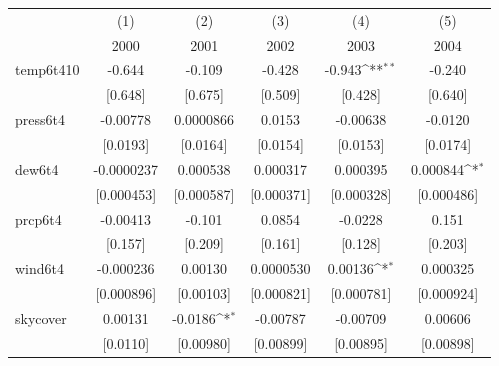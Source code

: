 \documentclass[11pt]{article}
\begin{document}
\begin{subappendices}
		\newpage
		\begin{center}
			 \label{tab:title} 
			{
				{
					\def\sym#1{\ifmmode^{#1}\else\(^{#1}\)\fi}
					\begin{tabular}{l*{5}{c}}
						\hline\hline
						&\multicolumn{1}{c}{(1)}&\multicolumn{1}{c}{(2)}&\multicolumn{1}{c}{(3)}&\multicolumn{1}{c}{(4)}&\multicolumn{1}{c}{(5)}\\
						&\multicolumn{1}{c}{2000}&\multicolumn{1}{c}{2001}&\multicolumn{1}{c}{2002}&\multicolumn{1}{c}{2003}&\multicolumn{1}{c}{2004}\\
						\hline
						temp6t410   &      -0.644         &      -0.109         &      -0.428         &      -0.943\sym{**} &      -0.240         \\
						&     [0.648]         &     [0.675]         &     [0.509]         &     [0.428]         &     [0.640]         \\
						[1em]
						press6t4    &    -0.00778         &   0.0000866         &      0.0153         &    -0.00638         &     -0.0120         \\
						&    [0.0193]         &    [0.0164]         &    [0.0154]         &    [0.0153]         &    [0.0174]         \\
						[1em]
						dew6t4      &  -0.0000237         &    0.000538         &    0.000317         &    0.000395         &    0.000844\sym{*}  \\
						&  [0.000453]         &  [0.000587]         &  [0.000371]         &  [0.000328]         &  [0.000486]         \\
						[1em]
						prcp6t4     &    -0.00413         &      -0.101         &      0.0854         &     -0.0228         &       0.151         \\
						&     [0.157]         &     [0.209]         &     [0.161]         &     [0.128]         &     [0.203]         \\
						[1em]
						wind6t4     &   -0.000236         &     0.00130         &   0.0000530         &     0.00136\sym{*}  &    0.000325         \\
						&  [0.000896]         &   [0.00103]         &  [0.000821]         &  [0.000781]         &  [0.000924]         \\
						[1em]
						skycover    &     0.00131         &     -0.0186\sym{*}  &    -0.00787         &    -0.00709         &     0.00606         \\
						&    [0.0110]         &   [0.00980]         &   [0.00899]         &   [0.00895]         &   [0.00898]         \\

\end{tabular}}}
\end{center}
\end{subappendices}
\end{document}

